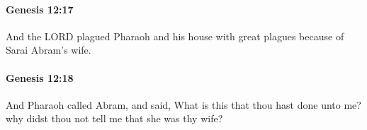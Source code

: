 		\paragraph{Genesis 12:17} %
			\label{GENESIS-12-17}

			And the LORD plagued Pharaoh and his house with great plagues because of Sarai Abram's wife.


		\paragraph{Genesis 12:18} %
			\label{GENESIS-12-18}

			And Pharaoh called Abram, and said, What is this that thou hast done unto me? why didst thou not tell me that she was thy wife?


